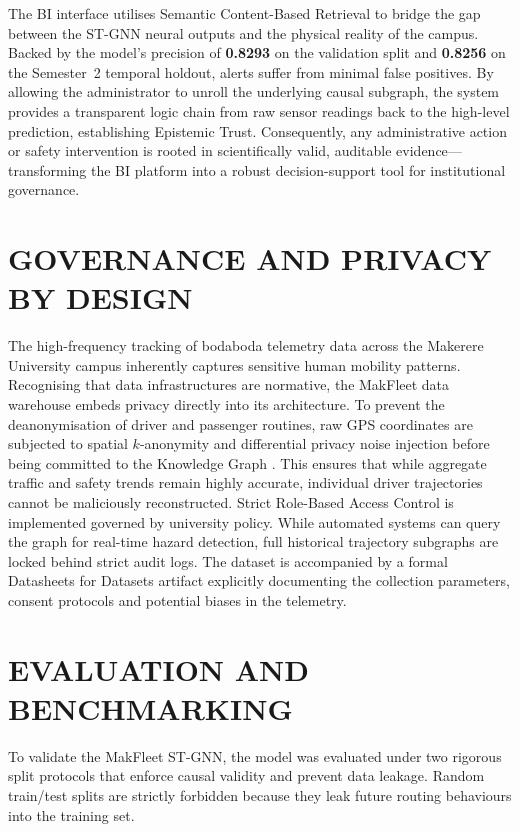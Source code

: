 \documentclass{ieeeaccess}
\begin{document}
The BI interface utilises Semantic Content-Based Retrieval to bridge
the gap between the ST-GNN neural outputs and the physical reality of
the campus. Backed by the model's precision of \textbf{0.8293} on the
validation split and \textbf{0.8256} on the Semester~2 temporal
holdout, alerts suffer from minimal false positives. By allowing the
administrator to unroll the underlying causal subgraph, the system
provides a transparent logic chain from raw sensor readings back to the
high-level prediction, establishing Epistemic Trust. Consequently, any
administrative action or safety intervention is rooted in
scientifically valid, auditable evidence---transforming the BI platform
into a robust decision-support tool for institutional governance.

\section{GOVERNANCE AND PRIVACY BY DESIGN}


The high-frequency tracking of bodaboda telemetry data across the Makerere University campus inherently captures sensitive human mobility patterns. Recognising that data infrastructures are normative, the MakFleet data warehouse embeds privacy directly into its architecture. To prevent the deanonymisation of driver and passenger routines, raw GPS coordinates are subjected to spatial $k$-anonymity and differential privacy noise injection before being committed to the Knowledge Graph \cite{demontjoye2013}. This ensures that while aggregate traffic and safety trends remain highly
accurate, individual driver trajectories cannot be maliciously reconstructed. Strict Role-Based Access Control is implemented governed by university policy. While automated systems can query the graph for real-time hazard detection, full historical trajectory subgraphs are locked behind strict audit logs.
The dataset is accompanied by a formal Datasheets for Datasets artifact explicitly documenting the collection parameters, consent protocols and
potential biases in the telemetry.


\section{EVALUATION AND BENCHMARKING}
\label{sec:evaluation}

To validate the MakFleet ST-GNN, the model was evaluated under two
rigorous split protocols that enforce causal validity and prevent data
leakage. Random train/test splits are strictly forbidden because they
leak future routing behaviours into the training set.
\end{document}
